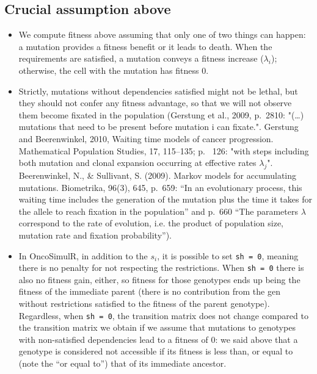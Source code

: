 \documentclass[11pt]{article}
\begin{document}
\subsection{Crucial assumption above}
\label{sec:org57fee67}
\begin{itemize}
\item We compute fitness above assuming that only one of two things can happen: a mutation provides a fitness benefit or it leads to death. When the requirements are satisfied, a mutation conveys a fitness increase (\(\lambda_i\)); otherwise, the cell with the mutation has fitness 0.

\item Strictly, mutations without dependencies satisfied might not be lethal, but they should not confer any fitness advantage, so that we will not observe them become fixated in the population (Gerstung et al., 2009, p.~2810: "(\ldots{}) mutations that need to be present before mutation i can fixate.". Gerstung and Beerenwinkel, 2010, Waiting time models of cancer
  progression. Mathematical Population Studies, 17, 115–135;  p.~ 126: "with steps including both mutation and clonal expansion occurring at effective rates $\lambda_j$". Beerenwinkel, N., \& Sullivant, S. (2009). Markov models for accumulating mutations. Biometrika, 96(3), 645, p.~659: ``In an evolutionary process, this waiting time includes the generation of the mutation plus the time it takes for the allele to reach fixation in the population'' and p.~660 ``The parameters $\lambda$ correspond to the rate of evolution, i.e. the product of population size, mutation rate and fixation probability'').




  
\item In OncoSimulR, in addition to the \(s_i\), it is possible to set \texttt{sh = 0}, meaning there is no penalty for not respecting the restrictions. When \texttt{sh = 0} there is also no fitness gain, either, so fitness for those genotypes ends up being the fitness of the immediate parent (there is no contribution from the gen without restrictions satisfied to the fitness of the parent genotype). Regardless, when \texttt{sh = 0}, the transition matrix does not change compared to the transition matrix we obtain if we assume that mutations to genotypes with non-satisfied dependencies lead to a fitness of 0: we said above that a genotype is considered
not accessible if its fitness is less than, or equal to (note the ``or equal to'') that of its immediate ancestor.
\end{itemize}
\end{document}
